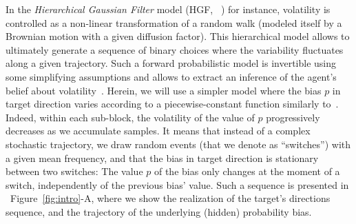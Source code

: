 \documentclass[12pt,english]{article}%
\newcommand{\citep}[1]{\parencite{#1}}
\newcommand{\citet}[1]{\textcite{#1}}
\newcommand{\seeFig}[1]{Figure~\ref{fig:#1}}
\begin{document}
In the \emph{Hierarchical Gaussian Filter} model (HGF, ~\citet{Mathys11}) for instance,
volatility is controlled as a non-linear transformation
of a random walk (modeled itself by a Brownian motion with a given diffusion factor).
This hierarchical model allows to ultimately generate a sequence of binary choices
where the variability fluctuates along a given trajectory.
Such a forward probabilistic model is invertible
using some simplifying assumptions and allows
to extract an inference of the agent's belief about volatility~\citep{Vossel14}.
Herein, we will use a simpler model where
the bias $p$ in target direction varies according to a piecewise-constant function
similarly to~\citet{Meyniel13}.
Indeed, within each sub-block, the volatility of the value of $p$
progressively decreases as we accumulate samples.
It means that instead of a complex stochastic trajectory,
we draw random events (that we denote as ``switches'')
with a given mean frequency,
and that the bias in target direction is stationary between two switches:
The value $p$ of the bias only changes at the moment of a switch,
independently of the previous bias' value.
Such a sequence is presented in ~\seeFig{intro}-A, %
where we show the realization of the target's directions sequence, and
the trajectory of the underlying (hidden) probability bias.
\end{document}
